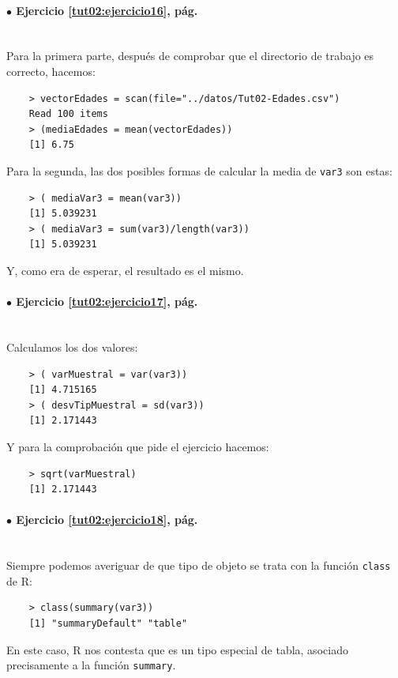 \documentclass[10pt,a4paper]{article}\usepackage[]{graphicx}\usepackage[]{color}
\newcounter {cont01}
\begin{document}
\paragraph{\bf $\bullet$ Ejercicio \ref{tut02:ejercicio16},  pág. \pageref{tut02:ejercicio16}}
\label{tut02:ejercicio16:sol}\quad\\
Para la primera parte, después de comprobar que el directorio de trabajo es correcto, hacemos:
\begin{verbatim}
    > vectorEdades = scan(file="../datos/Tut02-Edades.csv")
    Read 100 items
    > (mediaEdades = mean(vectorEdades))
    [1] 6.75
\end{verbatim}
Para la segunda, las dos posibles formas de calcular la media de {\tt var3} son estas:
\begin{verbatim}
    > ( mediaVar3 = mean(var3))
    [1] 5.039231
    > ( mediaVar3 = sum(var3)/length(var3))
    [1] 5.039231
\end{verbatim}
Y, como era de esperar, el resultado es el mismo.

\paragraph{\bf $\bullet$ Ejercicio \ref{tut02:ejercicio17},  pág. \pageref{tut02:ejercicio17}}
\label{tut02:ejercicio17:sol}\quad\\
Calculamos los dos valores:
\begin{verbatim}
    > ( varMuestral = var(var3))
    [1] 4.715165
    > ( desvTipMuestral = sd(var3))
    [1] 2.171443
\end{verbatim}
Y para la comprobación que pide el ejercicio hacemos:
\begin{verbatim}
    > sqrt(varMuestral)
    [1] 2.171443
\end{verbatim}

\paragraph{\bf $\bullet$ Ejercicio \ref{tut02:ejercicio18},  pág. \pageref{tut02:ejercicio18}}
\label{tut02:ejercicio18:sol}\quad\\
Siempre podemos averiguar de que tipo de objeto se trata con la función {\tt class} de R:
\begin{verbatim}
    > class(summary(var3))
    [1] "summaryDefault" "table"
\end{verbatim}
En este caso, R nos contesta que es un tipo especial de tabla, asociado precisamente a la función {\tt summary}.
\end{document}
